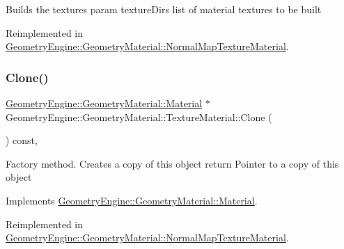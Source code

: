 Builds the textures param texture\+Dirs list of material textures to be built 

Reimplemented in \mbox{\hyperlink{class_geometry_engine_1_1_geometry_material_1_1_normal_map_texture_material_a42321fbd382c20de406f80d44849c183}{Geometry\+Engine\+::\+Geometry\+Material\+::\+Normal\+Map\+Texture\+Material}}.

\mbox{\label{class_geometry_engine_1_1_geometry_material_1_1_texture_material_ace905cf02deb41ad8aa422ef2fb9070f}} 
\subsubsection{\texorpdfstring{Clone()}{Clone()}}
{\footnotesize\ttfamily \mbox{\hyperlink{class_geometry_engine_1_1_geometry_material_1_1_material}{Geometry\+Engine\+::\+Geometry\+Material\+::\+Material}} $\ast$ Geometry\+Engine\+::\+Geometry\+Material\+::\+Texture\+Material\+::\+Clone (\begin{DoxyParamCaption}{ }\end{DoxyParamCaption}) const\hspace{0.3cm}{\ttfamily [override]}, {\ttfamily [virtual]}}

Factory method. Creates a copy of this object return Pointer to a copy of this object 

Implements \mbox{\hyperlink{class_geometry_engine_1_1_geometry_material_1_1_material_ae5513ff06d536365e18ddc5e07e79784}{Geometry\+Engine\+::\+Geometry\+Material\+::\+Material}}.



Reimplemented in \mbox{\hyperlink{class_geometry_engine_1_1_geometry_material_1_1_normal_map_texture_material_a3a3d1f16cf175f084bc3eeab56f6e42f}{Geometry\+Engine\+::\+Geometry\+Material\+::\+Normal\+Map\+Texture\+Material}}.

\mbox{\label{class_geometry_engine_1_1_geometry_material_1_1_texture_material_a946658ad56ad140e6e5ec5d12a15affc}} 
